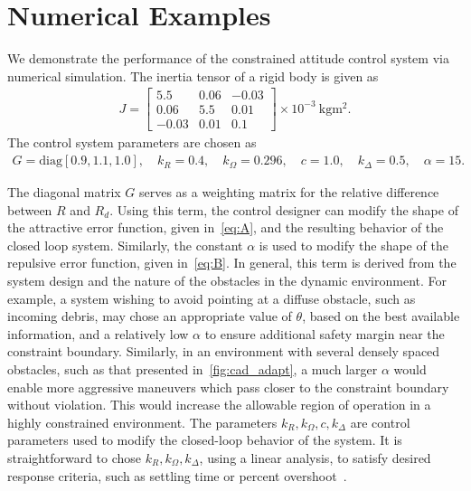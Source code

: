 \section{Numerical Examples}\label{sec:constrained_attitude_control_numerical_example}

We demonstrate the performance of the constrained attitude control system via numerical simulation.
The inertia tensor of a rigid body is given as
\begin{gather*}
    J = \begin{bmatrix}
	\num{5.5} & \num{0.06} & \num{-0.03} \\
	\num{0.06} & \num{5.5} & \num{0.01} \\
	\num{-0.03} & \num{0.01} & \num{0.1}
    \end{bmatrix} \times 10^{-3}~\si{\kilo\gram\meter\squared} .
\end{gather*} 
The control system parameters are chosen as
\begin{gather*}
	G = \text{diag} [0.9,1.1,1.0], \quad k_R = 0.4 , \quad	k_\Omega = 0.296 ,\quad
	c = 1.0 , \quad k_\Delta = 0.5 , \quad \alpha = 15 .
\end{gather*}

The diagonal matrix \( G \) serves as a weighting matrix for the relative difference between \( R \) and \( R_d \). 
Using this term, the control designer can modify the shape of the attractive error function, given in~\cref{eq:A}, and the resulting behavior of the closed loop system.
Similarly, the constant \( \alpha \) is used to modify the shape of the repulsive error function, given in~\cref{eq:B}.
In general, this term is derived from the system design and the nature of the obstacles in the dynamic environment.
For example, a system wishing to avoid pointing at a diffuse obstacle, such as incoming debris, may chose an appropriate value of \( \theta \), based on the best available information, and a relatively low \( \alpha \) to ensure additional safety margin near the constraint boundary. 
Similarly, in an environment with several densely spaced obstacles, such as that presented in~\cref{fig:cad_adapt}, a much larger \( \alpha \) would enable more aggressive maneuvers which pass closer to the constraint boundary without violation.
This would increase the allowable region of operation in a highly constrained environment.
The parameters \( k_R, k_\Omega, c, k_\Delta\) are control parameters used to modify the closed-loop behavior of the system.
It is straightforward to chose \( k_R, k_\Omega, k_\Delta\), using a linear analysis, to satisfy desired response criteria, such as settling time or percent overshoot~\cite{nise2004}.

